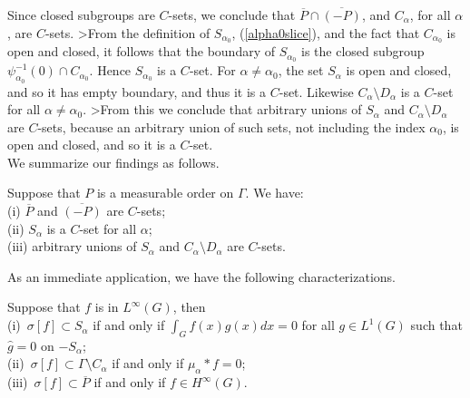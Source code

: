 \documentclass[12pt,leqno]{article}
\begin{document}
Since closed subgroups are $C$-sets, we conclude that
$\overline{P} \cap \overline{(-P)}$,
and $C_\alpha$, for all $\alpha$,
are $C$-sets.  
>From the definition of $S_{\alpha_0}$, (\ref{alpha0slice}),
and the fact that $C_{\alpha_0}$ is open and closed, it 
follows that the boundary of $S_{\alpha_0}$ is the 
closed subgroup $\psi_{\alpha_0}^{-1}(0)\cap C_{\alpha_0}$.
Hence $S_{\alpha_0}$ is a $C$-set.
For $\alpha\neq \alpha_0$, the set
$S_\alpha$ is open and closed,
and so it has 
empty boundary, and thus it is a $C$-set.  Likewise
$C_\alpha\setminus D_\alpha$ is a $C$-set for all
$\alpha\neq \alpha_0$.  
>From this we conclude that
arbitrary unions of $S_\alpha$ and $C_\alpha\setminus D_\alpha$
are $C$-sets, because an arbitrary union of
such sets, not including the index $\alpha_0$, is open and closed,
and so it is a $C$-set.  \\
We summarize our findings as follows.
\begin{prop}
Suppose that $P$ is a measurable order on $\Gamma$.  
We have:\\
(i)  $\overline{P}$ and $\overline{(-P)}$ are $C$-sets;\\
(ii) $S_\alpha$ is a $C$-set for all $\alpha$;\\
(iii)  arbitrary unions of $S_\alpha$ and $C_\alpha\setminus D_\alpha$
are $C$-sets.
\label{prop5.1}
\end{prop}







As an immediate application, we
have the following characterizations.
\begin{cor}
Suppose that $f$ is in $L^\infty(G)$,
then \\
(i)\  $\sigma[f] \subset S_\alpha$ if and only if 
$\int_G f(x) g(x) d x =0$ for all 
$g\in L^1(G)$ such that $\widehat{g}=0$ on $-S_\alpha$;\\
(ii)\  $\sigma[f] \subset \Gamma\setminus C_\alpha$ if and only if
$\mu_\alpha *f=0$;\\
(iii)\ $\sigma[f] \subset \overline{P}$ if and only if
$f\in H^\infty(G)$.
\label{cor5.3}
\end{cor}
\end{document}
